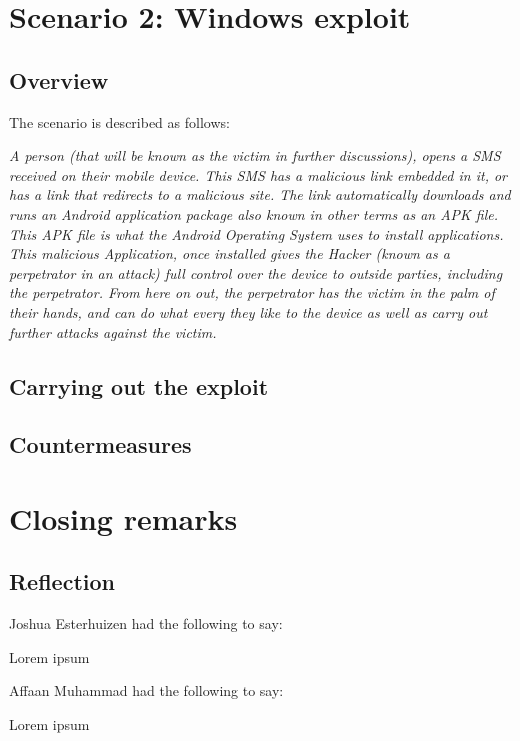 \documentclass[a4paper, 12pt, titlepage]{report}
\begin{document}
\chapter{Scenario 2: Windows exploit}
\section{Overview}
The scenario is described as follows:
\begin{displayquote}
\textit{A person (that will be known as the victim in further discussions), opens a SMS received on their mobile device. This SMS has a malicious link embedded in it, or has a link that redirects to a malicious site. The link automatically downloads and runs an Android application package also known in other terms as an APK file. This APK file is what the Android Operating System uses to install applications. This malicious Application, once installed gives the Hacker (known as a perpetrator in an attack) full control over the device to outside parties, including the perpetrator. From here on out, the perpetrator has the victim in the palm of their hands, and can do what every they like to the device as well as carry out further attacks against the victim.}
\end{displayquote}
\section{Carrying out the exploit}
\section{Countermeasures}
\chapter{Closing remarks}
\section{Reflection}
Joshua Esterhuizen had the following to say:
\begin{displayquote}
Lorem ipsum
\end{displayquote}
Affaan Muhammad had the following to say:
\begin{displayquote}
Lorem ipsum
\end{displayquote}
\end{document}
